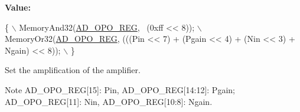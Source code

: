 {\bfseries Value\+:}
\begin{DoxyCode}
\{                                                                                    \(\backslash\)
        MemoryAnd32(\mbox{\hyperlink{a00020_aeca2931f15b40d772a94a66e4641619e}{AD\_OPO\_REG}}, ~(0xff << 8));                                           \(\backslash\)
        MemoryOr32(\mbox{\hyperlink{a00020_aeca2931f15b40d772a94a66e4641619e}{AD\_OPO\_REG}}, (((Pin << 7) + (Pgain << 4) + (Nin << 3) + Ngain) << 8)); \(\backslash\)
    \}
\end{DoxyCode}


Set the amplification of the amplifier. 

\begin{DoxyNote}{Note}
A\+D\+\_\+\+O\+P\+O\+\_\+\+R\+EG\mbox{[}15\mbox{]}\+: Pin, A\+D\+\_\+\+O\+P\+O\+\_\+\+R\+EG\mbox{[}14\+:12\mbox{]}\+: Pgain; A\+D\+\_\+\+O\+P\+O\+\_\+\+R\+EG\mbox{[}11\mbox{]}\+: Nin, A\+D\+\_\+\+O\+P\+O\+\_\+\+R\+EG\mbox{[}10\+:8\mbox{]}\+: Ngain. 
\end{DoxyNote}

